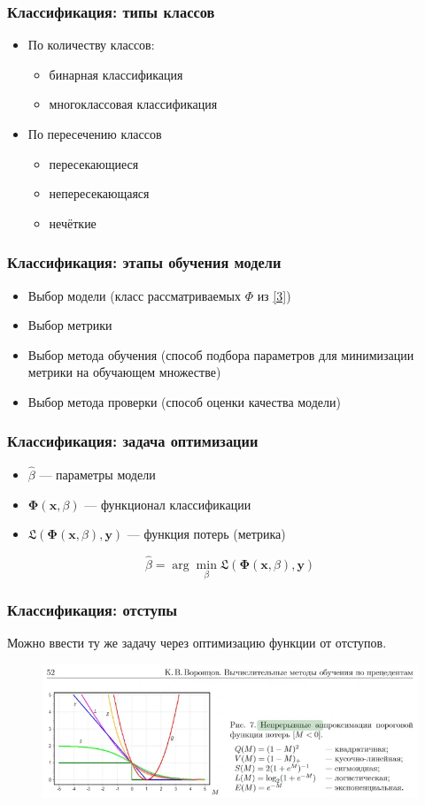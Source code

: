 \documentclass[11pt]{beamer}
\begin{document}
	\begin{frame}
		\frametitle{Классификация: типы классов}
		\begin{itemize}
			\item По количеству классов:
			\begin{itemize}
				\item бинарная классификация
				\item многоклассовая классификация
			\end{itemize}
			\item По пересечению классов 
			\begin{itemize}
				\item пересекающиеся
				\item непересекающаяся
				\item нечёткие
			\end{itemize}
		\end{itemize}
	\end{frame}
	\begin{frame}
		\frametitle{Классификация: этапы обучения модели}
		\begin{itemize}
			\item Выбор модели (класс рассматриваемых $\Phi$ из \ref{3})
			\item Выбор метрики
			\item Выбор метода обучения (способ подбора параметров для минимизации метрики на обучающем множестве)
			\item Выбор метода проверки (способ оценки качества модели)
		\end{itemize}
	\end{frame}
	\begin{frame}
		\frametitle{Классификация: задача оптимизации}
		\begin{itemize}
			\item $\hat{\beta}$ --- параметры модели
			\item $\bm{\Phi}(\bm{x}, \beta)$ --- функционал классификации
			\item $\mathfrak{L}(\bm{\Phi}(\bm{x}, \beta), \bm{y})$ --- функция потерь (метрика)
		\end{itemize}
		\begin{block}{}
			$$\hat{\beta} = \arg\min_{\beta} \mathfrak{L}(\bm{\Phi}(\bm{x}, \beta), \bm{y})$$
		\end{block}
	\end{frame}
	\begin{frame}
		\frametitle{Классификация: отступы}
		Можно ввести ту же задачу через оптимизацию функции от отступов.
		\begin{figure}
			\centering
			\includegraphics[width=0.7\linewidth]{imgs/margins}

			\label{fig:margins}
		\end{figure}
	\end{frame}
\end{document}
